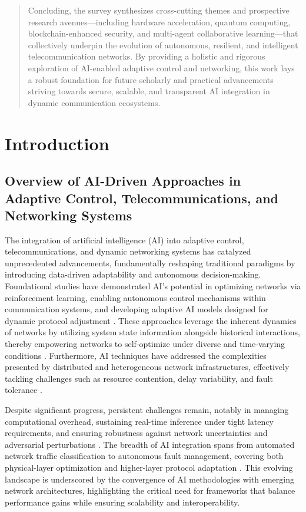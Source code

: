 \documentclass[sigconf]{acmart}
\begin{document}
\begin{abstract}
Concluding, the survey synthesizes cross-cutting themes and prospective research avenues—including hardware acceleration, quantum computing, blockchain-enhanced security, and multi-agent collaborative learning—that collectively underpin the evolution of autonomous, resilient, and intelligent telecommunication networks. By providing a holistic and rigorous exploration of AI-enabled adaptive control and networking, this work lays a robust foundation for future scholarly and practical advancements striving towards secure, scalable, and transparent AI integration in dynamic communication ecosystems.
\end{abstract}

\maketitle

\section{Introduction}

\subsection{Overview of AI-Driven Approaches in Adaptive Control, Telecommunications, and Networking Systems}

The integration of artificial intelligence (AI) into adaptive control, telecommunications, and dynamic networking systems has catalyzed unprecedented advancements, fundamentally reshaping traditional paradigms by introducing data-driven adaptability and autonomous decision-making. Foundational studies have demonstrated AI's potential in optimizing networks via reinforcement learning, enabling autonomous control mechanisms within communication systems, and developing adaptive AI models designed for dynamic protocol adjustment \cite{ref17,ref18,ref19,ref20}. These approaches leverage the inherent dynamics of networks by utilizing system state information alongside historical interactions, thereby empowering networks to self-optimize under diverse and time-varying conditions \cite{ref1,ref2,ref3}. Furthermore, AI techniques have addressed the complexities presented by distributed and heterogeneous network infrastructures, effectively tackling challenges such as resource contention, delay variability, and fault tolerance \cite{ref4,ref5,ref6}. 

Despite significant progress, persistent challenges remain, notably in managing computational overhead, sustaining real-time inference under tight latency requirements, and ensuring robustness against network uncertainties and adversarial perturbations \cite{ref7,ref8,ref9}. The breadth of AI integration spans from automated network traffic classification to autonomous fault management, covering both physical-layer optimization and higher-layer protocol adaptation \cite{ref10,ref49,ref50}. This evolving landscape is underscored by the convergence of AI methodologies with emerging network architectures, highlighting the critical need for frameworks that balance performance gains while ensuring scalability and interoperability.
\end{document}

